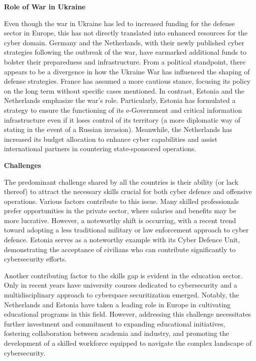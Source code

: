 \textbf{Role of War in Ukraine}

Even though the war in Ukraine has led to increased funding for the defense sector in Europe, this has not directly translated into enhanced resources for the cyber domain. Germany and the Netherlands, with their newly published cyber strategies following the outbreak of the war, have earmarked additional funds to bolster their preparedness and infrastructure. From a political standpoint, there appears to be a divergence in how the Ukraine War has influenced the shaping of defense strategies. France has assumed a more cautious stance, focusing its policy on the long term without specific cases mentioned. In contrast, Estonia and the Netherlands emphasize the war's role. Particularly, Estonia has formulated a strategy to ensure the functioning of its e-Government and critical information infrastructure even if it loses control of its territory (a more diplomatic way of stating in the event of a Russian invasion). Meanwhile, the Netherlands has increased its budget allocation to enhance cyber capabilities and assist international partners in countering state-sponsored operations.

\textbf{Challenges}

The predominant challenge shared by all the countries is their ability (or lack thereof) to attract the necessary skills crucial for both cyber defence and offensive operations. Various factors contribute to this issue. Many skilled professionals prefer opportunities in the private sector, where salaries and benefits may be more lucrative. However, a noteworthy shift is occurring, with a recent trend toward adopting a less traditional military or law enforcement approach to cyber defence. Estonia serves as a noteworthy example with its Cyber Defence Unit, demonstrating the acceptance of civilians who can contribute significantly to cybersecurity efforts.

Another contributing factor to the skills gap is evident in the education sector. Only in recent years have university courses dedicated to cybersecurity and a multidisciplinary approach to cyberspace securitization emerged. Notably, the Netherlands and Estonia have taken a leading role in Europe in cultivating educational programs in this field. However, addressing this challenge necessitates further investment and commitment to expanding educational initiatives, fostering collaboration between academia and industry, and promoting the development of a skilled workforce equipped to navigate the complex landscape of cybersecurity.

